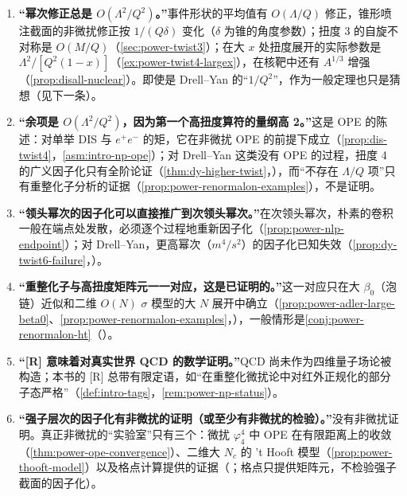 \begin{tcolorbox}[enhanced,breakable,title=常见误解（本章）,fonttitle=\bfseries,
  colback=yellow!3!white,colframe=orange!60!black,boxrule=0.6pt,arc=2pt,
  left=5pt,right=5pt,top=3pt,bottom=3pt,before skip=6pt,after skip=6pt]
\begin{enumerate}[label=(\arabic*),leftmargin=1.6em,itemsep=2pt,topsep=1pt]
\item %
\textbf{“幂次修正总是 $O(\Lambda^2/Q^2)$。”}事件形状的平均值有 $O(\Lambda/Q)$ 修正\cite{DokshitzerWebber1995}，锥形喷注截面的非微扰修正按 $1/(Q\delta)$ 变化（$\delta$ 为锥的角度参数）\cite{Korchemsky:1994is}；扭度 3 的自旋不对称是 $O(M/Q)$（\cref{sec:power-twist3}）；在大 $x$ 处扭度展开的实际参数是 $\Lambda^2/[Q^2(1-x)]$（\cref{ex:power-twist4-largex}），在核靶中还有 $A^{1/3}$ 增强（\cref{prop:disall-nuclear}）。即使是 Drell--Yan 的“$1/Q^2$”，作为一般定理也只是猜想（见下一条）。
\item %
\textbf{“余项是 $O(\Lambda^2/Q^2)$，因为第一个高扭度算符的量纲高 2。”}这是 OPE 的陈述：对单举 DIS 与 $e^+e^-$ 的矩，它在非微扰 OPE 的前提下成立（\cref{prop:dis-twist4}，\cref{asm:intro-np-ope}）；对 Drell--Yan 这类没有 OPE 的过程，扭度 4 的广义因子化只有全阶论证（\cref{thm:dy-higher-twist}，\tagA），而“不存在 $\Lambda/Q$ 项”只有重整化子分析的证据（\cref{prop:power-renormalon-examples}），不是证明。
\item %
\textbf{“领头幂次的因子化可以直接推广到次领头幂次。”}在次领头幂次，朴素的卷积一般在端点处发散，必须逐个过程地重新因子化（\cref{prop:power-nlp-endpoint}）；对 Drell--Yan，更高幂次（$m^4/s^2$）的因子化已知失效（\cref{prop:dy-twist6-failure}，\tagV）。
\item %
\textbf{“重整化子与高扭度矩阵元一一对应，这是已证明的。”}这一对应只在大 $\beta_0$（泡链）近似和二维 $O(N)$ $\sigma$ 模型的大 $N$ 展开中确立（\cref{prop:power-adler-large-beta0}、\cref{prop:power-renormalon-examples}，\tagP），一般情形是\cref{conj:power-renormalon-ht}（\tagC）。
\item %
\textbf{“[R] 意味着对真实世界 QCD 的数学证明。”}QCD 尚未作为四维量子场论被构造；本书的 [R] 总带有限定语，如“在重整化微扰论中对红外正规化的部分子态严格”（\cref{def:intro-tags}，\cref{rem:power-np-status}）。
\item %
\textbf{“强子层次的因子化有非微扰的证明（或至少有非微扰的检验）。”}没有非微扰证明。真正非微扰的“实验室”只有三个：微扰 $\varphi^4_4$ 中 OPE 在有限距离上的收敛（\cref{thm:power-ope-convergence}）、二维大 $N_c$ 的 't Hooft 模型（\cref{prop:power-thooft-model}）以及格点计算提供的证据（\tagP；格点只提供矩阵元，不检验强子截面的因子化）。
\end{enumerate}
\end{tcolorbox}
